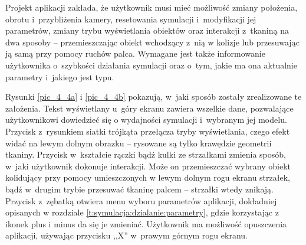 		\newpage
		
		
		
		Projekt aplikacji zakłada, że użytkownik musi mieć możliwość zmiany położenia, obrotu i~przybliżenia kamery, resetowania symulacji i~modyfikacji jej parametrów, zmiany trybu wyświetlania obiektów oraz interakcji z~tkaniną na dwa sposoby -- przemieszczając obiekt wchodzący z~nią w kolizje lub przesuwając ją samą przy pomocy ruchów palca. Wymagane jest także informowanie użytkownika o~szybkości działania symulacji oraz o~tym, jakie ma ona aktualnie parametry i~jakiego jest typu.
		
		Rysunki \ref{pic_4_4a} i \ref{pic_4_4b} pokazują, w~jaki sposób zostały zrealizowane te założenia. Tekst wyświetlany u~góry ekranu zawiera wszelkie dane, pozwalające użytkownikowi dowiedzieć się o wydajności symulacji i~wybranym jej modelu. Przycisk z~rysunkiem siatki trójkąta przełącza tryby wyświetlania, czego efekt widać na lewym dolnym obrazku -- rysowane są tylko krawędzie geometrii tkaniny. Przycisk w~kształcie rączki bądź kulki ze strzałkami zmienia sposób, w~jaki użytkownik dokonuje interakcji. Może on przemieszczać wybrany obiekt kolidujący przy pomocy umieszczonych w lewym dolnym rogu ekranu strzałek, bądź w~drugim trybie przesuwać tkaninę palcem -- strzałki wtedy znikają. Przycisk z~zębatką otwiera menu wyboru parametrów aplikacji, dokładniej opisanych w rozdziale \ref{t:symulacja:dzialanie:parametry}, gdzie korzystając z ikonek plus i minus da się je zmieniać. Użytkownik ma możliwość opuszczenia aplikacji, używając przycisku ,,X'' w~prawym górnym rogu ekranu.
